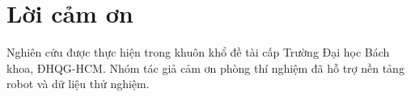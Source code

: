 
\section{Lời cảm ơn}

Nghiên cứu được thực hiện trong khuôn khổ đề tài cấp Trường Đại học Bách
khoa, ĐHQG-HCM. Nhóm tác giả cảm ơn phòng thí nghiệm đã hỗ trợ nền tảng
robot và dữ liệu thử nghiệm.
